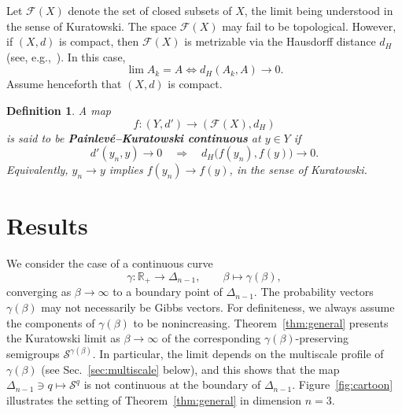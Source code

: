\documentclass[11pt,a4paper,longbibliography]{amsart}
\numberwithin{equation}{section}
\def\R{{\mathbb R}}
\def\R{{\mathbb R}}
\theoremstyle{plain}
\newtheorem{defn}{Definition}[section]
\theoremstyle{definition}
\theoremstyle{remark}
\begin{document}
	Let $\mathcal F(X)$ denote the set of closed subsets of $X$, the limit being understood in the sense of Kuratowski. The space $\mathcal{F}(X)$ may fail to be topological. However, if $(X,d)$ is compact, then $\mathcal F(X)$ is metrizable via the Hausdorff distance $d_H$ (see, e.g.,~\cite{Burago2001}).
	In this case,
	\begin{equation}
		\lim A_k= A
		\iff
		d_H(A_k,A)\to0.
	\end{equation}
	Assume henceforth that $(X,d)$ is compact.
	\begin{defn}
		A map
		\begin{equation}
			f:(Y,d')\to (\mathcal F(X),d_H)
		\end{equation}
		is said to be \textbf{Painlev\'e--Kuratowski continuous} at $y\in Y$ if
		\begin{equation}
			d'(y_n, y)\to 0
			\quad\Longrightarrow\quad
			d_H\bigl(f(y_n),f(y)\bigr)\to0.
		\end{equation}
		Equivalently,  $y_n\to y$ implies     $f(y_n)\to f(y)$,
		in the sense of Kuratowski.
	\end{defn}
	
	
	\section{Results}
	\label{sec:results} 
	We consider the case of a continuous curve   
	$$
	\gamma \colon \R_+ \to \Delta_{n-1}, \qquad \beta \mapsto \gamma(\beta),
	$$
	converging as $\beta\to\infty$ to a boundary point of $\Delta_{n-1}$.   The probability vectors $\gamma(\beta)$  may not necessarily be Gibbs vectors. For definiteness, we always assume the components of $\gamma(\beta)$ to be nonincreasing. Theorem~\ref{thm:general}  presents the Kuratowski limit as $\beta\to\infty$ of the corresponding  $\gamma(\beta)$-preserving semigroups $\mathcal{S}^{\gamma(\beta)}$. In particular, the limit depends on the multiscale profile of $\gamma(\beta)$ (see Sec.~\ref{sec:multiscale} below), and this shows that the map $\Delta_{n-1}\ni q\mapsto \mathcal{S}^q$ is not continuous at the boundary of $\Delta_{n-1}$. Figure~\ref{fig:cartoon} illustrates the setting of Theorem~\ref{thm:general} in dimension $n=3$.
	
\end{document}
